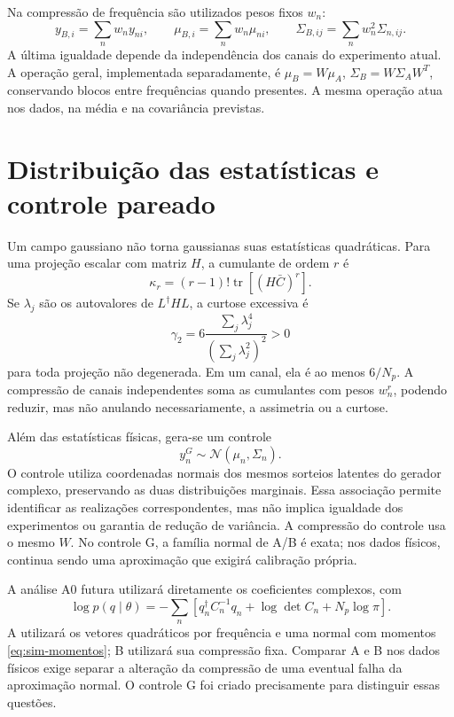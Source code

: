 Na compressão de frequência são utilizados pesos fixos \(w_n\):
\begin{equation}
 y_{B,i}=\sum_nw_ny_{ni},\qquad
 \mu_{B,i}=\sum_nw_n\mu_{ni},\qquad
 \Sigma_{B,ij}=\sum_nw_n^2\Sigma_{n,ij}.
 \label{eq:sim-compressao}
\end{equation}
A última igualdade depende da independência dos canais do experimento
atual. A operação geral, implementada separadamente, é
\(\mu_B=W\mu_A\), \(\Sigma_B=W\Sigma_AW^T\), conservando
blocos entre frequências quando presentes. A mesma operação atua nos
dados, na média e na covariância previstas.

\section{Distribuição das estatísticas e controle pareado}

Um campo gaussiano não torna gaussianas suas estatísticas quadráticas.
Para uma projeção escalar com matriz \(H\), a cumulante de ordem
\(r\) é
\begin{equation}
 \kappa_r=(r-1)!\operatorname{tr}[(H\bar C)^r].
 \label{eq:sim-cumulantes}
\end{equation}
Se \(\lambda_j\) são os autovalores de
\(L^\dagger HL\), a curtose excessiva é
\begin{equation}
 \gamma_2=6\frac{\sum_j\lambda_j^4}
                    {(\sum_j\lambda_j^2)^2}>0
 \label{eq:sim-curtose}
\end{equation}
para toda projeção não degenerada. Em um canal, ela é ao menos
\(6/N_p\). A compressão de canais independentes soma as cumulantes
com pesos \(w_n^r\), podendo reduzir, mas não anulando necessariamente,
a assimetria ou a curtose.

Além das estatísticas físicas, gera-se um controle
\begin{equation}
 y_n^{G}\sim\mathcal N(\mu_n,\Sigma_n).
 \label{eq:sim-controle}
\end{equation}
O controle utiliza coordenadas normais dos mesmos sorteios latentes do
gerador complexo, preservando as duas distribuições marginais. Essa
associação permite identificar as realizações correspondentes, mas não
implica igualdade dos experimentos ou garantia de redução de variância.
A compressão do controle usa o mesmo \(W\). No controle G, a família
normal de A/B é exata; nos dados físicos, continua sendo uma aproximação
que exigirá calibração própria.

A análise A0 futura utilizará diretamente os coeficientes complexos, com
\begin{equation}
 \log p(q\mid\theta)=
 -\sum_n\left[q_n^\dagger C_n^{-1}q_n+
             \log\det C_n+N_p\log\pi\right].
 \label{eq:sim-a0}
\end{equation}
A utilizará os vetores quadráticos por frequência e uma normal com
momentos \eqref{eq:sim-momentos}; B utilizará sua compressão fixa.
Comparar A e B nos dados físicos exige separar a alteração da
compressão de uma eventual falha da aproximação normal. O controle G
foi criado precisamente para distinguir essas questões.

